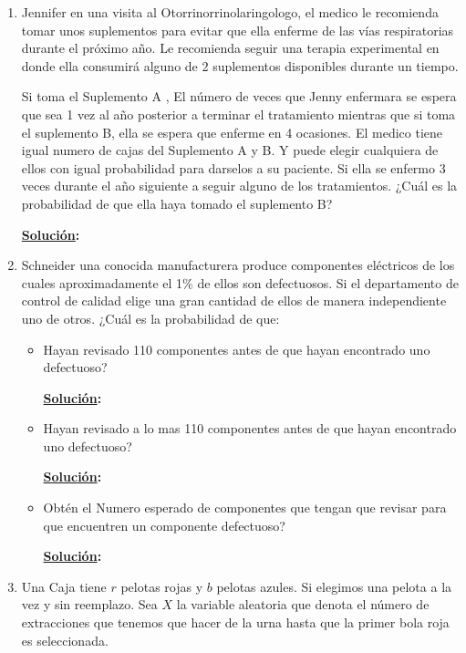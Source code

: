 \documentclass[11pt,letterpaper]{report}
\newcommand{\sol}{\textbf{\underline{Solución}: }} %
\begin{document}
\begin{enumerate}
\textit{Hint:} ¿Cuál es la razón por hora?

\sol

\item  Jennifer en una visita al Otorrinorrinolaringologo, el medico le recomienda tomar unos suplementos para evitar
que ella enferme de las vías respiratorias durante el próximo año. Le recomienda seguir una terapia experimental en
donde ella consumirá alguno de 2 suplementos disponibles durante un tiempo.

Si toma el Suplemento A , El número de veces que Jenny enfermara se espera que sea 1 vez al año posterior a terminar el
tratamiento mientras que si toma el suplemento B, ella se espera que enferme en 4 ocasiones. El medico tiene igual
numero de cajas del Suplemento A y B. Y puede elegir cualquiera de ellos con igual probabilidad para darselos a su
paciente. Si ella se enfermo 3 veces durante el año siguiente a seguir alguno de los tratamientos. ¿Cuál es la
probabilidad de que ella haya tomado el suplemento B?

\sol

\item Schneider una conocida manufacturera produce componentes eléctricos de los cuales aproximadamente el 1\% de ellos
son defectuosos. Si el departamento de control de calidad elige una gran cantidad de ellos de manera independiente uno
de otros. ¿Cuál es la probabilidad de que:

\begin{itemize}
    \item Hayan revisado 110 componentes antes de que hayan encontrado uno defectuoso?
    
    \sol

    \item Hayan revisado a lo mas 110 componentes antes de que hayan encontrado uno defectuoso?
    
    \sol

    \item Obtén el Numero esperado de componentes que tengan que revisar para que encuentren un componente defectuoso?
    
    \sol

\end{itemize}

\item Una Caja tiene $r$ pelotas rojas y $b$ pelotas azules. Si elegimos una pelota a la vez y sin reemplazo. Sea $X$
la variable aleatoria que denota el número de extracciones que tenemos que hacer de la urna hasta que la primer bola
roja es seleccionada.


\end{enumerate}
\end{document}
